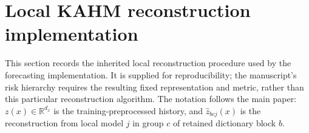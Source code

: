 \section{Local KAHM reconstruction implementation}
\label{supp:kahm-implementation}

This section records the inherited local reconstruction procedure used by the
forecasting implementation. It is supplied for reproducibility; the manuscript's
risk hierarchy requires the resulting fixed representation and metric, rather
than this particular reconstruction algorithm. The notation follows the main
paper: $z(x)\in\mathbb R^{d_x}$ is the training-preprocessed history, and
$\widehat z_{bcj}(x)$ is the reconstruction from local model $j$ in group $c$
of retained dictionary block $b$.

